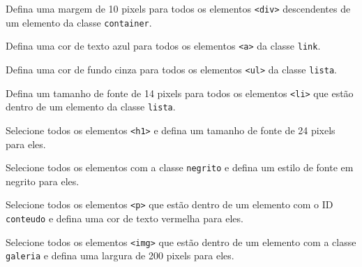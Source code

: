 \begin{exercise}
Defina uma margem de 10 pixels para todos os elementos \texttt{<div>} descendentes de um elemento da classe \texttt{container}.
\end{exercise}

\begin{exercise}
Defina uma cor de texto azul para todos os elementos \texttt{<a>} da classe \texttt{link}.
\end{exercise}

\begin{exercise}
Defina uma cor de fundo cinza para todos os elementos \texttt{<ul>} da classe \texttt{lista}.
\end{exercise}

\begin{exercise}
Defina um tamanho de fonte de 14 pixels para todos os elementos \texttt{<li>} que estão dentro de um elemento da classe \texttt{lista}.
\end{exercise}

\begin{exercise}
Selecione todos os elementos \texttt{<h1>} e defina um tamanho de fonte de 24 pixels para eles.
\end{exercise}

\begin{exercise}
Selecione todos os elementos com a classe \texttt{negrito} e defina um estilo de fonte em negrito para eles.
\end{exercise}

\begin{exercise}
Selecione todos os elementos \texttt{<p>} que estão dentro de um elemento com o ID \texttt{conteudo} e defina uma cor de texto vermelha para eles.
\end{exercise}

\begin{exercise}
Selecione todos os elementos \texttt{<img>} que estão dentro de um elemento com a classe \texttt{galeria} e defina uma largura de 200 pixels para eles.
\end{exercise}

